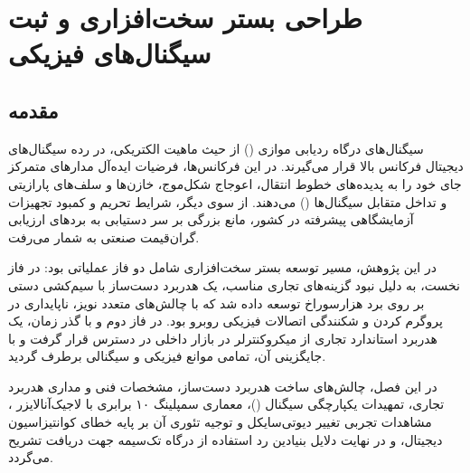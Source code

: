
\chapter{طراحی بستر سخت‌افزاری و ثبت سیگنال‌های فیزیکی }
\label{ch:hardware}

\section{مقدمه}
سیگنال‌های درگاه ردیابی موازی () از حیث ماهیت الکتریکی، در رده سیگنال‌های دیجیتال فرکانس بالا قرار می‌گیرند. در این فرکانس‌ها، فرضیات ایده‌آل مدارهای متمرکز جای خود را به پدیده‌های خطوط انتقال، اعوجاج شکل‌موج، خازن‌ها و سلف‌های پارازیتی و تداخل متقابل سیگنال‌ها () می‌دهند. از سوی دیگر، شرایط تحریم و کمبود تجهیزات آزمایشگاهی پیشرفته در کشور، مانع بزرگی بر سر دستیابی به بردهای ارزیابی گران‌قیمت صنعتی به شمار می‌رفت. 

در این پژوهش، مسیر توسعه بستر سخت‌افزاری شامل دو فاز عملیاتی بود: در فاز نخست، به دلیل نبود گزینه‌های تجاری مناسب، یک هدربرد دست‌ساز با سیم‌کشی دستی بر روی برد هزارسوراخ توسعه داده شد که با چالش‌های متعدد نویز، ناپایداری در پروگرم کردن و شکنندگی اتصالات فیزیکی روبرو بود. در فاز دوم و با گذر زمان، یک هدربرد استاندارد تجاری از میکروکنترلر  در بازار داخلی در دسترس قرار گرفت و با جایگزینی آن، تمامی موانع فیزیکی و سیگنالی برطرف گردید. 

در این فصل، چالش‌های ساخت هدربرد دست‌ساز، مشخصات فنی و مداری هدربرد تجاری، تمهیدات یکپارچگی سیگنال ()، معماری سمپلینگ ۱۰ برابری با لاجیک‌آنالایزر ، مشاهدات تجربی تغییر دیوتی‌سایکل و توجیه تئوری آن بر پایه خطای کوانتیزاسیون دیجیتال، و در نهایت دلایل بنیادین رد استفاده از درگاه تک‌سیمه  جهت دریافت  تشریح می‌گردد.


